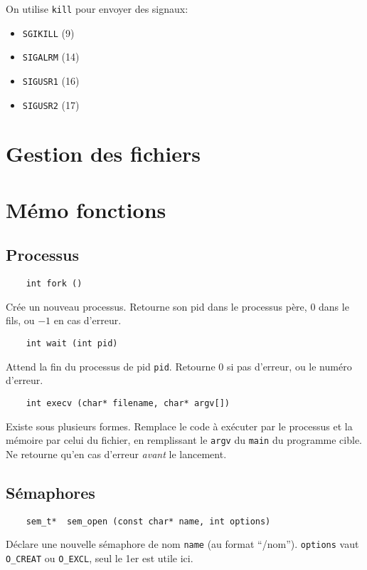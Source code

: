 \documentclass[10pt,twocolumn,a4paper]{article}
\begin{document}
On utilise \texttt{kill} pour envoyer des signaux:
\begin{itemize}
    \item \texttt{SGIKILL} (9)
    \item \texttt{SIGALRM} (14)
    \item \texttt{SIGUSR1} (16)
    \item \texttt{SIGUSR2} (17)
\end{itemize}

\section{Gestion des fichiers}




\section{Mémo fonctions}

\subsection{Processus}

\begin{lstlisting}
    int fork ()
\end{lstlisting}

Cr\'ee un nouveau processus.
Retourne son pid dans le processus p\`ere, $0$ dans le fils, ou $-1$ en cas d'erreur.

\begin{lstlisting}
    int wait (int pid)
\end{lstlisting}

Attend la fin du processus de pid \texttt{pid}.
Retourne 0 si pas d'erreur, ou le num\'ero d'erreur.

\begin{lstlisting}
    int execv (char* filename, char* argv[])
\end{lstlisting}

Existe sous plusieurs formes.
Remplace le code à exécuter par le processus et la mémoire par celui du fichier, en remplissant le \texttt{argv} du \texttt{main} du programme cible.
Ne retourne qu'en cas d'erreur \emph{avant} le lancement.

\subsection{Sémaphores}

\begin{lstlisting}
    sem_t*  sem_open (const char* name, int options)
\end{lstlisting}
Déclare une nouvelle sémaphore de nom \texttt{name} (au format ``/nom''). 
\texttt{options} vaut \texttt{O\_CREAT} ou \texttt{O\_EXCL}, seul le 1er est utile ici.
\end{document}
